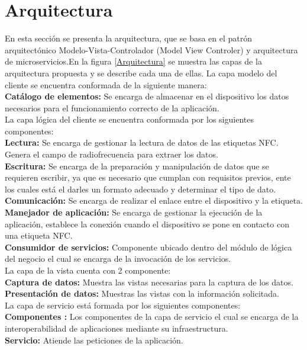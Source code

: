 \documentclass[11pt,openany]{book}
\newcounter{ns}
\begin{document}
	\section{Arquitectura}
	En esta sección se presenta la arquitectura, que se basa en el patrón arquitectónico Modelo-Vista-Controlador (Model View Controler) y arquitectura de microservicios.En la figura \ref{Arquitectura} se muestra las capas de la arquitectura propuesta y se describe cada una de ellas. La capa modelo del cliente se encuentra conformada de la siguiente manera:\\
	\textbf{Catálogo de elementos: }Se encarga de almacenar en el dispositivo los datos necesarios para el funcionamiento correcto de la aplicación.\\ [0.25cm]
	La capa lógica del cliente se encuentra conformada por los siguientes componentes:\\
	\textbf{Lectura: }Se encarga de gestionar la lectura de datos de las etiquetas NFC. Genera el campo de radiofrecuencia para extraer los datos.\\
	\textbf{Escritura: }Se encarga de la preparación y manipulación de datos que se requieren escribir, ya que es necesario que cumplan con requisitos previos, ente los cuales está el darles un formato adecuado y determinar el tipo de dato.\\
	\textbf{Comunicación: }Se encarga de realizar el enlace entre el dispositivo y la etiqueta.\\
	\textbf{Manejador de aplicación: }Se encarga de gestionar la ejecución de la aplicación, establece la conexión cuando el dispositivo se pone en contacto con una etiqueta NFC.\\
	\textbf{Consumidor de servicios: }Componente ubicado dentro del módulo de lógica del negocio el cual se encarga de la invocación de los servicios.\\ [0.25 cm]
	La capa de la vista cuenta con 2 componente:\\
	\textbf{Captura de datos: }Muestra las vistas necesarias para la captura de los datos.\\
	\textbf{Presentación de datos: }Muestras las vistas con la información solicitada.\\[0.25 cm]
	La capa de servicio está formada por los siguientes componentes:\\
	\textbf{Componentes : }Los componentes de la capa de servicio el cual se encarga de la interoperabilidad de aplicaciones mediante su infraestructura.\\
	\textbf{Servicio: }Atiende las peticiones de la aplicación.\\[0.25 cm]
\end{document}
